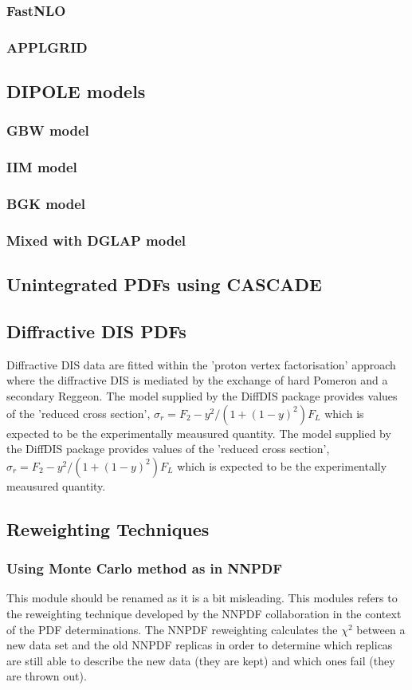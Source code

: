 \documentclass[11pt,a4paper]{article}
\begin{document}
\subsubsection{FastNLO}
\subsubsection{APPLGRID}
\subsection{DIPOLE models}
\subsubsection{GBW model}
\subsubsection{IIM model}
\subsubsection{BGK model}
\subsubsection{Mixed with DGLAP model}
\subsection{Unintegrated PDFs using CASCADE}
\subsection{Diffractive DIS PDFs}
Diffractive DIS data are fitted within the 'proton vertex factorisation' approach where 
the diffractive DIS is mediated by the exchange of hard Pomeron and a secondary Reggeon.
The model supplied by the DiffDIS package provides values of the 'reduced cross section',
$\sigma_r = F_2 - y^2/(1+(1-y)^2) F_L$
which is expected to be the experimentally meausured quantity.
The model supplied by the DiffDIS package provides values of the 'reduced cross section',
$\sigma_r = F_2 - y^2/(1+(1-y)^2) F_L$
which is expected to be the experimentally meausured quantity.

\subsection{Reweighting Techniques}
\subsubsection{Using Monte Carlo method as in NNPDF}
This module should be renamed as it is a bit misleading.
This modules refers to the reweighting technique developed
by the NNPDF collaboration in the context of the PDF determinations.
The NNPDF reweighting calculates the $\chi^2$ between a new data set and the old NNPDF replicas in order to determine which replicas are still able to describe the new data (they are kept) and which ones fail (they are thrown out).
\end{document}

